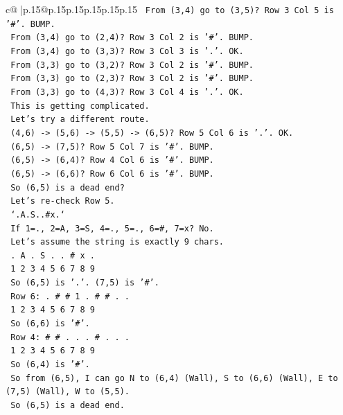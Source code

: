\documentclass{article}
\begin{document}
{\begin{supertabular}{c@{$\;$}|p{.15\linewidth}@{}p{.15\linewidth}p{.15\linewidth}p{.15\linewidth}p{.15\linewidth}p{.15\linewidth}}
{{{\texttt{   From (3,4) go to (3,5)? Row 3 Col 5 is '\#'. BUMP.} \\
\texttt{   From (3,4) go to (2,4)? Row 3 Col 2 is '\#'. BUMP.} \\
\texttt{   From (3,4) go to (3,3)? Row 3 Col 3 is '.'. OK.} \\
\texttt{   From (3,3) go to (3,2)? Row 3 Col 2 is '\#'. BUMP.} \\
\texttt{   From (3,3) go to (2,3)? Row 3 Col 2 is '\#'. BUMP.} \\
\texttt{   From (3,3) go to (4,3)? Row 3 Col 4 is '.'. OK.} \\
\texttt{   This is getting complicated.} \\
\texttt{   Let's try a different route.} \\
\texttt{   (4,6) {-}> (5,6) {-}> (5,5) {-}> (6,5)? Row 5 Col 6 is '.'. OK.} \\
\texttt{   (6,5) {-}> (7,5)? Row 5 Col 7 is '\#'. BUMP.} \\
\texttt{   (6,5) {-}> (6,4)? Row 4 Col 6 is '\#'. BUMP.} \\
\texttt{   (6,5) {-}> (6,6)? Row 6 Col 6 is '\#'. BUMP.} \\
\texttt{   So (6,5) is a dead end?} \\
\texttt{   Let's re{-}check Row 5.} \\
\texttt{   `.A.S..\#x.`} \\
\texttt{   If 1=., 2=A, 3=S, 4=., 5=., 6=\#, 7=x? No.} \\
\texttt{   Let's assume the string is exactly 9 chars.} \\
\texttt{   . A . S . . \# x .} \\
\texttt{   1 2 3 4 5 6 7 8 9} \\
\texttt{   So (6,5) is '.'. (7,5) is '\#'.} \\
\texttt{   Row 6: . \# \# 1 . \# \# . .} \\
\texttt{   1 2 3 4 5 6 7 8 9} \\
\texttt{   So (6,6) is '\#'.} \\
\texttt{   Row 4: \# \# . . . \# . . .} \\
\texttt{   1 2 3 4 5 6 7 8 9} \\
\texttt{   So (6,4) is '\#'.} \\
\texttt{   So from (6,5), I can go N to (6,4) (Wall), S to (6,6) (Wall), E to (7,5) (Wall), W to (5,5).} \\
\texttt{   So (6,5) is a dead end.} \\
\\ 
}}}
\end{supertabular}}
\end{document}
